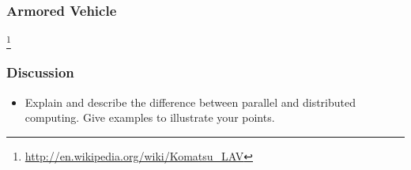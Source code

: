 \documentclass{beamer}
\begin{document}
\begin{CJK}{UTF8}{bsmi}
\begin{frame}
\frametitle{Armored Vehicle}
\centerline{}
\footnote{\url{http://en.wikipedia.org/wiki/Komatsu_LAV}}
\end{frame}

\begin{frame}
\frametitle{Discussion} 
\begin{itemize}
\item Explain and describe the difference between parallel and
  distributed computing.  Give examples to illustrate your points.
\end{itemize}
\end{frame}


\end{CJK}
\end{document}
